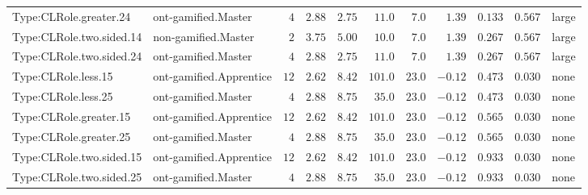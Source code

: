 \documentclass[6pt,a4paper]{article}
\begin{document}
{\begin{longtable}{llrrrrrrrrl}
Type:CLRole.greater.24&ont-gamified.Master&$ 4$&$2.88$&$ 2.75$&$ 11.0$&$  7.0$&$ 1.39$&$0.133$&$0.567$&large\tabularnewline
Type:CLRole.two.sided.14&non-gamified.Master&$ 2$&$3.75$&$ 5.00$&$ 10.0$&$  7.0$&$ 1.39$&$0.267$&$0.567$&large\tabularnewline
Type:CLRole.two.sided.24&ont-gamified.Master&$ 4$&$2.88$&$ 2.75$&$ 11.0$&$  7.0$&$ 1.39$&$0.267$&$0.567$&large\tabularnewline
Type:CLRole.less.15&ont-gamified.Apprentice&$12$&$2.62$&$ 8.42$&$101.0$&$ 23.0$&$-0.12$&$0.473$&$0.030$&none\tabularnewline
Type:CLRole.less.25&ont-gamified.Master&$ 4$&$2.88$&$ 8.75$&$ 35.0$&$ 23.0$&$-0.12$&$0.473$&$0.030$&none\tabularnewline
Type:CLRole.greater.15&ont-gamified.Apprentice&$12$&$2.62$&$ 8.42$&$101.0$&$ 23.0$&$-0.12$&$0.565$&$0.030$&none\tabularnewline
Type:CLRole.greater.25&ont-gamified.Master&$ 4$&$2.88$&$ 8.75$&$ 35.0$&$ 23.0$&$-0.12$&$0.565$&$0.030$&none\tabularnewline
\newpage
Type:CLRole.two.sided.15&ont-gamified.Apprentice&$12$&$2.62$&$ 8.42$&$101.0$&$ 23.0$&$-0.12$&$0.933$&$0.030$&none\tabularnewline
Type:CLRole.two.sided.25&ont-gamified.Master&$ 4$&$2.88$&$ 8.75$&$ 35.0$&$ 23.0$&$-0.12$&$0.933$&$0.030$&none\tabularnewline
\hline
\end{longtable}}
\end{document}
